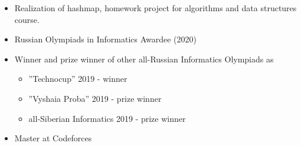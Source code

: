 \documentclass[10pt,a4paper,ragged2e]{altacv}
\begin{document}

\begin{itemize}
\item Realization of hashmap, homework project for algorithms and data
structures course.
\end{itemize}

\smallskip
\begin{itemize}
\item Russian Olympiads in Informatics Awardee (2020)
\smallskip
\item Winner and prize winner of other all-Russian Informatics Olympiads as 
\smallskip
\begin{itemize}
    \item ”Technocup” 2019 - winner
    \item ”Vyshaia Proba” 2019 - prize winner
    \item all-Siberian Informatics 2019 - prize winner
\end{itemize}
\smallskip
\item Master at Codeforces
\end{itemize}




\end{document}
